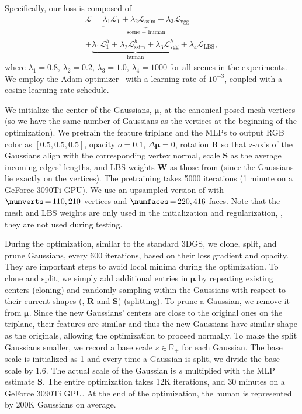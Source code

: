 %
%
Specifically, our loss is composed of
\begin{multline}
\mathcal{L} = \underbrace{\lambda_1 \mathcal{L}_1 + \lambda_2 \mathcal{L}_{\text{ssim}} + \lambda_3 \mathcal{L}_{\text{vgg}}}_{\text{scene + human}} \\ + \underbrace{\lambda_1 \mathcal{L}^h_1 + \lambda_2 \mathcal{L}^h_{\text{ssim}} + \lambda_3 \mathcal{L}^h_{\text{vgg}}}_{\text{human}} + \lambda_4 \mathcal{L}_{\text{LBS}},
\end{multline}
%
where $\lambda_1 = 0.8$, $\lambda_2 = 0.2$, $\lambda_3 = 1.0$, $\lambda_4 = 1000$ for all scenes in the experiments.
%
We employ the Adam optimizer~\cite{KingBa15} with a learning rate of $10^{-3}$, coupled with a cosine learning rate schedule.




%
We initialize the center of the Gaussians, $\bm\mu$, at the canonical-posed \smpl mesh vertices (so we have the same number of Gaussians as the \smpl vertices at the beginning of the optimization). We pretrain the feature triplane and the MLPs to output RGB color as $[0.5, 0.5, 0.5]$, opacity $o = 0.1$, $\Delta \bm{\mu} = 0$, rotation $\bm{R}$ so that z-axis of the Gaussians align with the corresponding \smpl vertex normal, scale $\bm{S}$ as the average incoming edges' lengths, and LBS weights $\bm{W}$ as those from \smpl (since the Gaussians lie exactly on the \smpl vertices).
%
The pretraining takes 5000 iterations (1 minute on a  GeForce 3090Ti GPU).
%
We use an upsampled version of \smpl with $\numverts \, {=} \, 110,210$ vertices and $\numfaces \, {=} \, 220,416$ faces.
%
Note that the \smpl mesh and LBS weights are only used in the initialization and regularization, \ie, they are not used during testing.


During the optimization, similar to the standard 3DGS, we clone, split, and prune Gaussians, every 600 iterations, based on their loss gradient and opacity.
%
They are important steps to avoid local minima during the optimization.
%
To clone and split, we simply add additional entries in $\bm{\mu}$ by repeating existing centers (cloning) and randomly sampling within the Gaussians with respect to their current shapes (\ie, $\bm{R}$ and $\bm{S}$) (splitting).
%
To prune a Gaussian, we remove it from $\bm{\mu}$.
%
Since the new Gaussians' centers are close to the original ones on the triplane, their features are similar and thus the new Gaussians have similar shape as the originals, allowing the optimization to proceed normally.
%
To make the split Gaussians smaller, we record a base scale $s \in \mathbb{R}_+$ for each Gaussian. The base scale is initialized as 1 and every time a Gaussian is split, we divide the base scale by 1.6. The actual scale of the Gaussian is $s$ multiplied with the MLP estimate $\bm{S}$.
%
The entire optimization takes 12K iterations, and 30 minutes on a GeForce 3090Ti GPU.  At the end of the optimization, the human is represented by 200K Gaussians on average.
%

